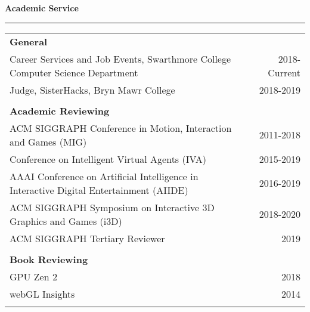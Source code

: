 \needspace{6em}
{\large {\bf Academic Service}}
\vspace{0.1cm}
\hrule
\begin{tabular*}{7.1in}{@{}l@{\extracolsep\fill}r}

{\bf General } & \\
Career Services and Job Events, Swarthmore College Computer Science Department & 2018-Current \\
Judge, SisterHacks, Bryn Mawr College & 2018-2019 \\
\phantom{yommomma} & \phantom{2002}\\

{\bf Academic Reviewing } & \\
ACM SIGGRAPH Conference in Motion, Interaction and Games (MIG) & 2011-2018 \\
Conference on Intelligent Virtual Agents (IVA) & 2015-2019\\
AAAI Conference on Artificial Intelligence in Interactive Digital Entertainment (AIIDE) & 2016-2019 \\
ACM SIGGRAPH Symposium on Interactive 3D Graphics and Games (i3D) & 2018-2020 \\
ACM SIGGRAPH Tertiary Reviewer & 2019 \\
\phantom{yommomma} & \phantom{2002}\\

{\bf Book Reviewing } & \\
GPU Zen 2 & 2018 \\
webGL Insights & 2014 \\
\phantom{yommomma} & \phantom{2002}\\
\end{tabular*}


